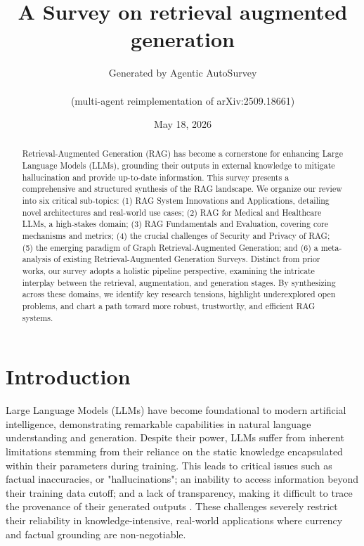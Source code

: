 \documentclass[11pt]{article}
\title{A Survey on retrieval augmented generation}
\author{Generated by Agentic AutoSurvey \\\\ (multi-agent reimplementation of arXiv:2509.18661)}
\date{May 18, 2026}
\begin{document}
\maketitle

\begin{abstract}
Retrieval-Augmented Generation (RAG) has become a cornerstone for enhancing Large Language Models (LLMs), grounding their outputs in external knowledge to mitigate hallucination and provide up-to-date information. This survey presents a comprehensive and structured synthesis of the RAG landscape. We organize our review into six critical sub-topics: (1) RAG System Innovations and Applications, detailing novel architectures and real-world use cases; (2) RAG for Medical and Healthcare LLMs, a high-stakes domain; (3) RAG Fundamentals and Evaluation, covering core mechanisms and metrics; (4) the crucial challenges of Security and Privacy of RAG; (5) the emerging paradigm of Graph Retrieval-Augmented Generation; and (6) a meta-analysis of existing Retrieval-Augmented Generation Surveys. Distinct from prior works, our survey adopts a holistic pipeline perspective, examining the intricate interplay between the retrieval, augmentation, and generation stages. By synthesizing across these domains, we identify key research tensions, highlight underexplored open problems, and chart a path toward more robust, trustworthy, and efficient RAG systems.
\end{abstract}

\section{Introduction}
Large Language Models (LLMs) have become foundational to modern artificial intelligence, demonstrating remarkable capabilities in natural language understanding and generation. Despite their power, LLMs suffer from inherent limitations stemming from their reliance on the static knowledge encapsulated within their parameters during training. This leads to critical issues such as factual inaccuracies, or "hallucinations"; an inability to access information beyond their training data cutoff; and a lack of transparency, making it difficult to trace the provenance of their generated outputs . These challenges severely restrict their reliability in knowledge-intensive, real-world applications where currency and factual grounding are non-negotiable.
\end{document}
